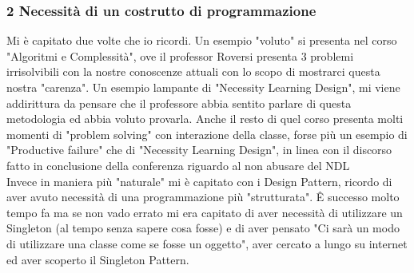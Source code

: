 \documentclass[a4paper]{article}
\begin{document}
\subsubsection{2 Necessità di un costrutto di programmazione}
Mi è capitato due volte che io ricordi. Un esempio "voluto" si presenta nel corso "Algoritmi e Complessità", ove il professor Roversi presenta 3 problemi irrisolvibili con la nostre conoscenze attuali con lo scopo di mostrarci questa nostra "carenza". Un esempio lampante di "Necessity Learning Design", mi viene addirittura da pensare che il professore abbia sentito parlare di questa metodologia ed abbia voluto provarla.
Anche il resto di quel corso presenta molti momenti di "problem solving" con interazione della classe, forse più un esempio di "Productive failure" che di "Necessity Learning Design", in linea con il discorso fatto in conclusione della conferenza riguardo al non abusare del NDL\\
Invece in maniera più "naturale" mi è capitato con i Design Pattern, ricordo di aver avuto necessità di una programmazione più "strutturata". Ê successo molto tempo fa ma se non vado errato mi era capitato di aver necessità di utilizzare un Singleton (al tempo senza sapere cosa fosse) e di aver pensato "Ci sarà un modo di utilizzare una classe come se fosse un oggetto", aver cercato a lungo su internet ed aver scoperto il Singleton Pattern.

\printbibliography
\end{document}
